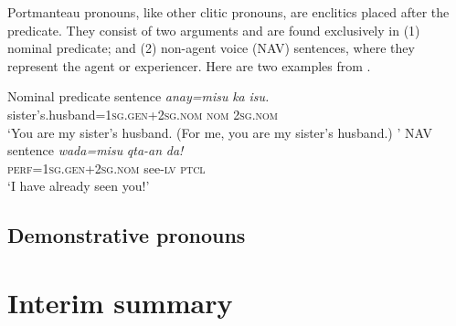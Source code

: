 Portmanteau pronouns, like other clitic pronouns, are enclitics placed after the predicate. They consist of two arguments and are found exclusively in (1) nominal predicate; and (2) non-agent voice (NAV) sentences, where they represent the agent or experiencer. Here are two examples from \textcite[74--75]{Lee2018Trugrammar}.

\begin{exe}

    \ex Nominal predicate sentence
    \gll \textit{anay=misu} \textit{ka} \textit{isu.} \\
    sister's.husband=\textsc{1sg.gen+2sg.nom} \textsc{nom} \textsc{2sg.nom}\\
    \trans `You are my sister's husband. (For me, you are my sister's husband.) '
    \ex NAV sentence
    \gll \textit{wada=misu} \textit{qta-an} \textit{da!} \\
    \textsc{perf}=\textsc{1sg.gen+2sg.nom} see-\textsc{lv} \textsc{ptcl}\\
    \trans `I have already seen you!'
\end{exe}

\subsection{Demonstrative pronouns}
\lipsum[1-10]

\section{Interim summary}
\lipsum[1-4]
